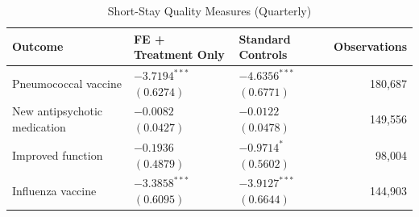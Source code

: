 \documentclass[12pt]{article}
\begin{document}
\begin{table}[H]
\centering
\caption{Short-Stay Quality Measures (Quarterly)}
\label{tab:fe-only-short-stay-quality}
\small
\setlength{\tabcolsep}{6pt}
\begin{tabularx}{\textwidth}{@{} l Y Y r @{}}
\toprule
Outcome & FE + Treatment Only & Standard Controls & Observations \\
\midrule
Pneumococcal vaccine &  &  & 180,687 \\
New antipsychotic medication &  &  & 149,556 \\
Improved function &  &  & 98,004 \\
Influenza vaccine &  &  & 144,903 \\
\bottomrule
\end{tabularx}
\end{table}
\end{document}
